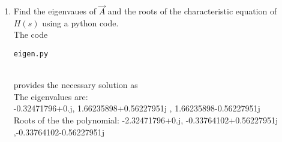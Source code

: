 \begin{enumerate}[label=\thesection.\arabic*.,ref=\thesection.\theenumi]
\item Find the eigenvaues of $\vec{A}$ and the roots of the characteristic equation of $H(s)$ using a python code.
\\
\solution
The code 
\begin{lstlisting}
eigen.py
\end{lstlisting}\\
provides the necessary solution as\\
The eigenvalues are:\\
-0.32471796+0.j, 1.66235898+0.56227951j , 1.66235898-0.56227951j\\
Roots of the the polynomial:
-2.32471796+0.j, -0.33764102+0.56227951j ,-0.33764102-0.56227951j\\

\end{enumerate}
